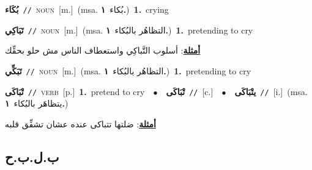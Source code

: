 \documentclass[10pt,a4paper,twoside]{article} %
\begin{document}
\begin{multicols}{2}
{\setlength\topsep{0pt}\textbf{\foreignlanguage{arabic}{بُكَاء}}\ {\color{gray}\texttt{//}\color{black}}\ \textsc{noun}\ [m.]\ \color{gray}(msa. \foreignlanguage{arabic}{بُكاء}~\foreignlanguage{arabic}{\textbf{١.}})\color{black}\ \textbf{1.}~crying\ } \vspace{2mm}

{\setlength\topsep{0pt}\textbf{\foreignlanguage{arabic}{تَبَاكِي}}\ {\color{gray}\texttt{//}\color{black}}\ \textsc{noun}\ [m.]\ \color{gray}(msa. \foreignlanguage{arabic}{التظاهُر بالبُكاء}~\foreignlanguage{arabic}{\textbf{١.}})\color{black}\ \textbf{1.}~pretending to cry\  \begin{flushright}\color{gray}\foreignlanguage{arabic}{\textbf{\underline{\foreignlanguage{arabic}{أمثلة}}}: أسلوب التَّباكِي واستعطاف الناس مش حلو بحقِّك}\end{flushright}\color{black}} \vspace{2mm}

{\setlength\topsep{0pt}\textbf{\foreignlanguage{arabic}{تَبَكِّي}}\ {\color{gray}\texttt{//}\color{black}}\ \textsc{noun}\ [m.]\ \color{gray}(msa. \foreignlanguage{arabic}{التظاهُر بالبُكاء}~\foreignlanguage{arabic}{\textbf{١.}})\color{black}\ \textbf{1.}~pretending to cry\ } \vspace{2mm}

{\setlength\topsep{0pt}\textbf{\foreignlanguage{arabic}{تْبَاكَى}}\ {\color{gray}\texttt{//}\color{black}}\ \textsc{verb}\ [p.]\ \textbf{1.}~pretend to cry\ \ $\bullet$\ \ \setlength\topsep{0pt}\textbf{\foreignlanguage{arabic}{تْبَاكَى}}\ {\color{gray}\texttt{//}\color{black}}\ [c.]\ \ $\bullet$\ \ \setlength\topsep{0pt}\textbf{\foreignlanguage{arabic}{يتْبَاكَى}}\ {\color{gray}\texttt{//}\color{black}}\ [i.]\ \color{gray}(msa. \foreignlanguage{arabic}{يتظاهَر بالبُكاء}~\foreignlanguage{arabic}{\textbf{١.}})\color{black}\  \begin{flushright}\color{gray}\foreignlanguage{arabic}{\textbf{\underline{\foreignlanguage{arabic}{أمثلة}}}: ضلتها تتباكى عنده عشان تشفِّق قلبه}\end{flushright}\color{black}} \vspace{2mm}

\vspace{-3mm}
\subsection*{\color{blue}\foreignlanguage{arabic}{ب.ل.ب.ح}\color{blue}{}} 


\end{multicols}
\end{document}
